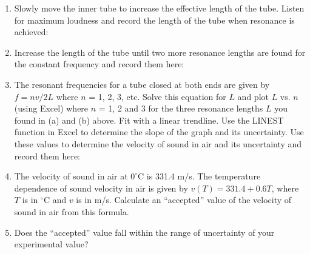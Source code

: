 \begin{enumerate}[labparts]
\item Slowly move the inner tube to increase the effective length of the tube. Listen for maximum loudness and record the length of the tube when resonance is achieved:
\vspace{10mm}

\item Increase the length of the tube until two more resonance lengths are found for the constant frequency and record them here:
\vspace{10mm}


\item The resonant frequencies for a tube closed at both ends are given by 
$f=nv/2L$ where $n$ = 1, 2, 3, etc. Solve this equation for $L$ and plot $L$ 
vs. $n$ (using Excel) where $n$ = 1, 2 and 3 for the three resonance lengths $L$
you found in (a) and (b) above. Fit with a linear trendline. Use the LINEST function in Excel to determine the slope of the graph and its uncertainty. Use these values to determine the velocity of sound in air and its uncertainty and record them here:
\vspace{20mm}

\item The velocity of sound in air at $0^\circ$C is 331.4 m/s.  The temperature dependence of sound velocity in air is given by $v(T) = 331.4 + 0.6T$, where $T$ is in $^\circ$C and $v$ is in m/s. Calculate an ``accepted'' value of the velocity of sound in air from this formula.
\vspace{20mm}

\item Does the ``accepted'' value fall within the range of uncertainty of your experimental value?
\answerspace{5mm}
\end{enumerate}
